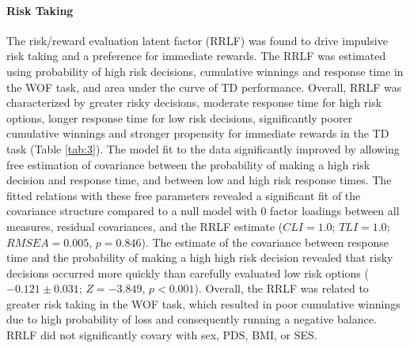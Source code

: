 \documentclass{article}%
\begin{document}
\paragraph*{Risk Taking} The risk/reward evaluation latent factor (RRLF) was found to drive impulsive risk taking and a preference for immediate rewards. The RRLF was estimated using probability of high risk decisions, cumulative winnings and response time in the WOF task, and area under the curve of TD performance. Overall, RRLF was characterized by greater risky decisions, moderate response time for high risk options, longer response time for low risk decisions, significantly poorer cumulative winnings and stronger propensity for immediate rewards in the TD task (Table \ref{tab:3}). The model fit to the data significantly improved by allowing free estimation of covariance between the probability of making a high risk decision and response time, and between low and high risk response times. The fitted relations with these free parameters revealed a significant fit of the covariance structure compared to a null model with 0 factor loadings between all measures, residual covariances, and the RRLF estimate ($CLI = 1.0$; $TLI = 1.0$; $RMSEA = 0.005$, $p = 0.846$). The estimate of the covariance between response time and the probability of making a high high risk decision revealed that risky decisions occurred more quickly than carefully evaluated low risk options ($-0.121\pm0.031$; $Z=-3.849$, $p<0.001$). Overall, the RRLF was related to greater risk taking in the WOF task, which resulted in poor cumulative winnings due to high probability of loss and consequently running a negative balance. RRLF did not significantly covary with sex, PDS, BMI, or SES.
\end{document}

